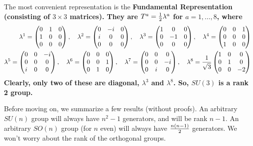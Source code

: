 \documentclass[12pt,epsf]{article}
\def\nolabel{\nonumber }
\def\nolabel{\nonumber }
\begin{document}
The most convenient representation is the \bf Fundamental Representation \rm
(consisting of $3\times 3$ matrices).  They are $T^a = {1\over 2}
\lambda^a$ for $a=1,\ldots,8$, where 
\begin{eqnarray}
\lambda^1 = 
\begin{pmatrix}
0 & 1 & 0 \\ 1 & 0 & 0 \\ 0 & 0 & 0
\end{pmatrix}, \quad \lambda^2 = 
\begin{pmatrix}
0 & -i & 0 \\ i & 0 & 0 \\ 0 & 0 & 0
\end{pmatrix}, \quad \lambda^3 = 
\begin{pmatrix}
1 & 0 & 0 \\ 0 & -1 & 0 \\ 0 & 0 & 0
\end{pmatrix}, \quad \lambda^4 = 
\begin{pmatrix}
0 & 0 & 1 \\ 0 & 0 & 0 \\ 1 & 0 & 0
\end{pmatrix} \nolabel	\\
\lambda^5 = 
\begin{pmatrix}
0 & 0 & -i \\ 0 & 0 & 0 \\ i & 0 & 0 
\end{pmatrix}, \quad \lambda^6 = 
\begin{pmatrix}
0 & 0 & 0 \\ 0 & 0 & 1 \\ 0 & 1 & 0
\end{pmatrix}, \quad \lambda^7 = 
\begin{pmatrix}
0 & 0 & 0 \\ 0 & 0 & -i \\ 0 & i & 0
\end{pmatrix}, \quad \lambda^8 = {1\over \sqrt{3}}
\begin{pmatrix}
1 & 0 & 0 \\ 0 & 1 & 0 \\ 0 & 0 & -2
\end{pmatrix} \nolabel \\
\label{eq:gellman}
\end{eqnarray}
Clearly, only two of these are diagonal, $\lambda^3$ and $\lambda^8$. 
So, $SU(3)$ is a rank 2 group.  

Before moving on, we summarize a few results (without proofs).	An
arbitrary $SU(n)$ group will always have $n^2-1$ generators, and will
be rank $n-1$.	An arbitrary $SO(n)$  group (for $n$ even) will always
have ${n(n-1)\over 2}$ generators.  We won't worry about the rank of the
orthogonal groups.  
\end{document}
